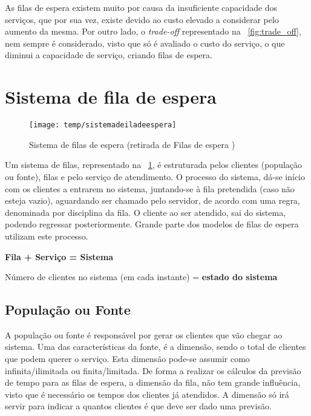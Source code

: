 As filas de espera existem muito por causa da insuficiente capacidade dos serviços, que por sua vez, existe devido ao custo elevado a considerar pelo aumento da mesma. Por outro lado, o \textit{trade-off} representado na \figurename~\ref{fig:trade_off}, nem sempre é considerado, visto que só é avaliado o custo do serviço, o que diminui a capacidade de serviço, criando filas de espera.


\section{Sistema de fila de espera} 
\label{sec:sistemadefiladeespera}

\begin{figure}[ht]
    \centering
    \texttt{[image: temp/sistemadeiladeespera]}
      \caption{Sistema de filas de espera (retirada de Filas de espera \cite{filasdeespera})}
  \label{fig:sistemadeiladeespera}
\end{figure}

Um sistema de filas, representado na \figurename~\ref{fig:sistemadeiladeespera}, é estruturada pelos clientes (população ou fonte), filas e pelo serviço de atendimento. O processo do sistema, dá-se início com os clientes a entrarem no sistema, juntando-se à fila pretendida (caso não esteja vazio), aguardando ser chamado pelo servidor, de acordo com uma regra, denominada por disciplina da fila. O cliente ao ser atendido, sai do sistema, podendo regressar posteriormente. Grande parte dos modelos de filas de espera utilizam este processo.

\begin{center} \textbf{Fila + Serviço = Sistema} \end{center} 
\begin{center} Número de clientes no sistema (em cada instante) = \textbf{estado do sistema} \end{center} 

\subsection{População ou Fonte} 

A população ou fonte é responsável por gerar os clientes que vão chegar ao sistema. Uma das características da fonte, é a dimensão, sendo o total de clientes que podem querer o serviço. Esta dimensão pode-se assumir como infinita/ilimitada ou finita/limitada. De forma a realizar os cálculos da previsão de tempo para as filas de espera, a dimensão da fila, não tem grande influência, visto que é necessário os tempos dos clientes já atendidos. A dimensão só irá servir para indicar a quantos clientes é que deve ser dado uma previsão. 

